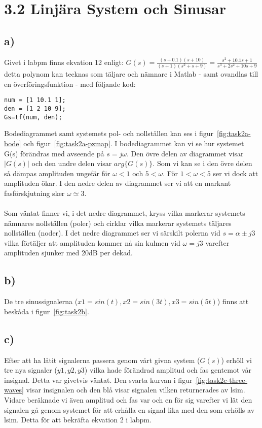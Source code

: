 \section*{3.2 Linjära System och Sinusar}
\subsection*{a)}
Givet i labpm finns ekvation 12 enligt: 
$G(s) = \frac{(s+0.1)(s+10)}{(s+1)(s^2+s+9)} =
\frac{s^2+10.1s+1}{s^3+2s^2+10s+9}$
detta polynom kan tecknas som täljare och nämnare i Matlab - samt ovandlas till
en överföringsfunktion - med följande kod:

\begin{lstlisting}
num = [1 10.1 1];
den = [1 2 10 9];
Gs=tf(num, den);
\end{lstlisting}

Bodediagrammet samt systemets pol- och nollställen kan ses i
figur~\ref{fig:task2a-bode} och figur~\ref{fig:task2a-pzmap}. I bodediagrammet 
kan vi se hur systemet G(s) förändras med avseende på $s=j\omega$. Den övre
delen av diagrammet visar $|G(s)|$ och den undre delen visar $arg\{G(s)\}$.
Som vi kan se i den övre delen så dämpas amplituden ungefär för $\omega < 1
\text{ och } 5 < \omega$. För $1 < \omega < 5$ ser vi dock att amplituden ökar. I
den nedre delen av diagrammet ser vi att en markant fasförskjutning sker
$\omega \simeq 3$.\\\\
Som väntat finner vi, i det nedre diagrammet, kryss vilka markerar systemets
nämnares nollställen (poler) och cirklar vilka markerar systemets täljares
nollställen (noder). I det nedre diagrammet ser vi särskilt polerna vid
$s=\alpha \pm j3$ vilka förtäljer att amplituden kommer nå sin kulmen vid
$\omega = j3$ varefter amplituden sjunker med 20dB per dekad.

\subsection*{b)}
De tre sinussignalerna ($x1 = sin(t), x2 = sin(3t), x3 = sin(5t)$) finns att
beskåda i figur~\ref{fig:task2b}.

\subsection*{c)}
Efter att ha låtit signalerna passera genom vårt givna system ($G(s)$) erhöll
vi tre nya signaler ($y1, y2, y3$) vilka hade förändrad amplitud och fas
gentemot vår insignal. Detta var givetvis väntat. Den svarta kurvan i
figur~\ref{fig:task2c-three-waves} visar
insignalen och den blå visar signalen vilken returnerades av lsim. Vidare
beräknade vi även amplitud och fas var och en för sig varefter vi lät den
signalen gå genom systemet för att erhålla en signal lika med den som erhölls
av lsim. Detta för att bekräfta ekvation 2 i labpm.

